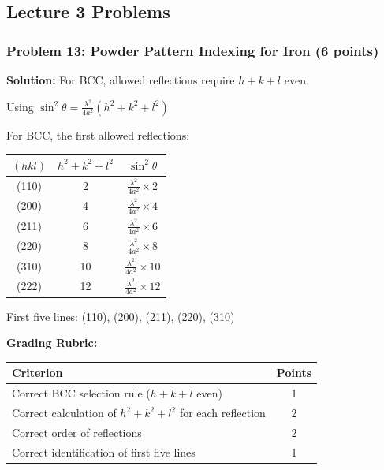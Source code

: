 \documentclass[12pt,a4paper]{article}
\begin{document}
\subsection*{Lecture 3 Problems}

\subsubsection*{Problem 13: Powder Pattern Indexing for Iron (6 points)}
\textbf{Solution:}
For BCC, allowed reflections require $h+k+l$ even.

Using $\sin^2\theta = \frac{\lambda^2}{4a^2}(h^2 + k^2 + l^2)$

For BCC, the first allowed reflections:
\begin{center}
\begin{tabular}{|c|c|c|}
\hline
$(hkl)$ & $h^2+k^2+l^2$ & $\sin^2\theta$ \\
\hline
(110) & 2 & $\frac{\lambda^2}{4a^2} \times 2$ \\
(200) & 4 & $\frac{\lambda^2}{4a^2} \times 4$ \\
(211) & 6 & $\frac{\lambda^2}{4a^2} \times 6$ \\
(220) & 8 & $\frac{\lambda^2}{4a^2} \times 8$ \\
(310) & 10 & $\frac{\lambda^2}{4a^2} \times 10$ \\
(222) & 12 & $\frac{\lambda^2}{4a^2} \times 12$ \\
\hline
\end{tabular}
\end{center}

First five lines: (110), (200), (211), (220), (310)

\textbf{Grading Rubric:}
\begin{table}[h]
\centering
\begin{tabular}{|p{10cm}|c|}
\hline
\textbf{Criterion} & \textbf{Points} \\
\hline
Correct BCC selection rule ($h+k+l$ even) & 1 \\
Correct calculation of $h^2+k^2+l^2$ for each reflection & 2 \\
Correct order of reflections & 2 \\
Correct identification of first five lines & 1 \\
\hline
\end{tabular}
\end{table}
\end{document}

